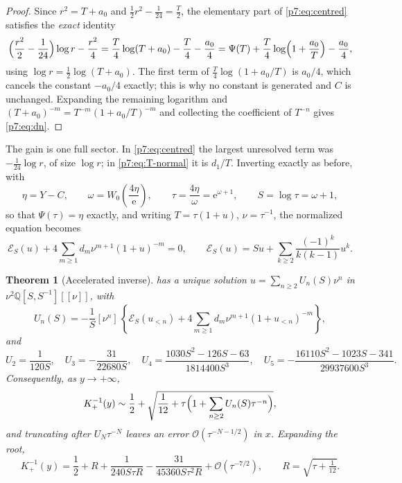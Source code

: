 \documentclass[11pt,a4paper,oneside]{book}
\theoremstyle{plain}
\newtheorem{theorem}{Theorem}[chapter]
\theoremstyle{definition}
\theoremstyle{remark}
\newcommand{\Rat}{\mathbb{Q}}
\newcommand{\e}{\mathrm{e}}
\newcommand{\Coef}[1]{[#1]\,}
\newcommand{\bigO}{\mathcal{O}}
\newcommand{\Wlam}{W}
\begin{document}
\begin{proof}
Since $r^{2}=T+a_0$ and $\tfrac12r^{2}-\tfrac1{24}=\tfrac T2$, the elementary
part of \eqref{p7:eq:centred} satisfies the \emph{exact} identity
\[
 \Bigl(\frac{r^{2}}2-\frac1{24}\Bigr)\log r-\frac{r^{2}}4
 =\frac T4\log(T+a_0)-\frac T4-\frac{a_0}4
 =\Psi(T)+\frac T4\log\Bigl(1+\frac{a_0}T\Bigr)-\frac{a_0}4 ,
\]
using $\log r=\tfrac12\log(T+a_0)$.  The first term of
$\tfrac T4\log(1+a_0/T)$ is $a_0/4$, which cancels the constant $-a_0/4$
exactly; this is why no constant is generated and $C$ is unchanged.  Expanding
the remaining logarithm and $(T+a_0)^{-m}=T^{-m}(1+a_0/T)^{-m}$ and collecting
the coefficient of $T^{-n}$ gives \eqref{p7:eq:dn}.
\end{proof}

The gain is one full sector.  In \eqref{p7:eq:centred} the largest unresolved
term was $-\tfrac1{24}\log r$, of size $\log r$; in \eqref{p7:eq:T-normal} it
is $d_1/T$.  Inverting exactly as before, with
\begin{equation}\label{p7:eq:acc-vars}
 \eta=Y-C,
 \qquad
 \omega=\Wlam_0\!\left(\frac{4\eta}{\e}\right),
 \qquad
 \tau=\frac{4\eta}{\omega}=\e^{\omega+1},
 \qquad
 S=\log\tau=\omega+1,
\end{equation}
so that $\Psi(\tau)=\eta$ exactly, and writing $T=\tau(1+u)$, $\nu=\tau^{-1}$,
the normalized equation becomes
\begin{equation}\label{p7:eq:acc-implicit}
 \mathcal{E}_S(u)+4\sum_{m\ge1}d_m\nu^{m+1}(1+u)^{-m}=0,
 \qquad
 \mathcal{E}_S(u)=Su+\sum_{k\ge2}\frac{(-1)^{k}}{k(k-1)}u^{k} .
\end{equation}

\begin{theorem}[Accelerated inverse]\label{p7:thm:accelerated}
 has a unique solution
$u=\sum_{n\ge2}U_n(S)\nu^{n}$ in $\nu^{2}\Rat[S,S^{-1}][[\nu]]$, with
\begin{equation}\label{p7:eq:U-recurrence}
 U_n(S)=-\frac1S\Coef{\nu^{n}}
 \left\{\mathcal{E}_S(u_{<n})+4\sum_{m\ge1}d_m\nu^{m+1}(1+u_{<n})^{-m}\right\},
\end{equation}
and
\begin{equation}\label{p7:eq:U-values}
 U_2=\frac1{120S},\quad
 U_3=-\frac{31}{22680S},\quad
 U_4=\frac{1030S^{2}-126S-63}{1814400S^{3}},\quad
 U_5=-\frac{16110S^{2}-1023S-341}{29937600S^{3}} .
\end{equation}
Consequently, as $y\to+\infty$,
\begin{equation}\label{p7:eq:accelerated-main}
 K_+^{-1}(y)\sim\frac12+\sqrt{\frac1{12}
 +\tau\Bigl(1+\sum_{n\ge2}U_n(S)\tau^{-n}\Bigr)},
\end{equation}
and truncating after $U_N\tau^{-N}$ leaves an error $\bigO(\tau^{-N-1/2})$ in
$x$.  Expanding the root,
\begin{equation}\label{p7:eq:accelerated-expanded}
 K_+^{-1}(y)=\frac12+R+\frac1{240S\tau R}-\frac{31}{45360S\tau^{2}R}
 +\bigO(\tau^{-7/2}),
 \qquad R=\sqrt{\tau+\tfrac1{12}} .
\end{equation}
\end{theorem}
\end{document}
